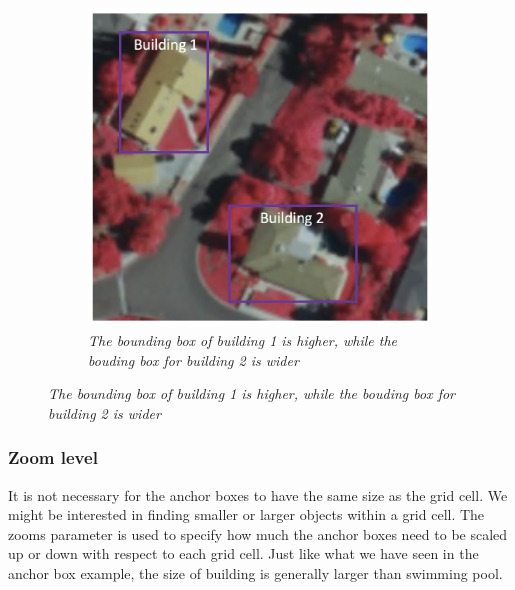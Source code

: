 \begin{figure}[H]
    \centering
    \begin{subfigure}[b]{0.5\textwidth}
        \centering
        \includegraphics[width=\textwidth]{Figures/2. Related Work/ssd_4.png}
        \caption{\textit{
                The bounding box of building 1 is higher, while the bouding box
                for building 2 is wider
            } \cite{ssd_1}}
    \end{subfigure}
\end{figure}

\subsubsection{Zoom level}
It is not necessary for the anchor boxes to have the same size as the grid cell.
We might be interested in finding smaller or larger objects within a grid cell.
The zooms parameter is used to specify how much the anchor boxes need to be
scaled up or down with respect to each grid cell. Just like what we have seen in
the anchor box example, the size of building is generally larger than swimming
pool.

